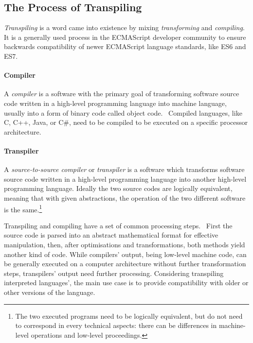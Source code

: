 \subsection{The Process of Transpiling}

\emph{Transpiling} is a word came into existence by mixing \emph{transforming} and \emph{compiling}. It is a generally used process in the ECMAScript developer community to ensure backwards compatibility of newer ECMAScript language standards, like ES6 and ES7.

\paragraph{Compiler}

A \emph{compiler} is a software with the primary goal of transforming software source code written in a high-level programming language into machine language, usually into a form of binary code called object code.~\cite{pcmagcompilers} Compiled languages, like C, C++, Java, or C\#, need to be compiled to be executed on a specific processor architecture.

\paragraph{Transpiler}

A \emph{source-to-source compiler} or \emph{transpiler} is a software which transforms software source code written in a high-level programming language into another high-level programming language. Ideally the two source codes are logically equivalent, meaning that with given abstractions, the operation of the two different software is the same.\footnote{The two executed programs need to be logically equivalent, but do not need to correspond in every technical aspects: there can be differences in machine-level operations and low-level proceedings.}

Transpiling and compiling have a set of common processing steps.~\cite{kulkarnitranspiler} First the source code is parsed into an abstract mathematical format for effective manipulation, then, after optimisations and transformations, both methods yield another kind of code. While compilers' output, being low-level machine code, can be generally executed on a computer architecture without further transformation steps, transpilers' output need further processing. Considering transpiling interpreted languages', the main use case is to provide compatibility with older or other versions of the language.

